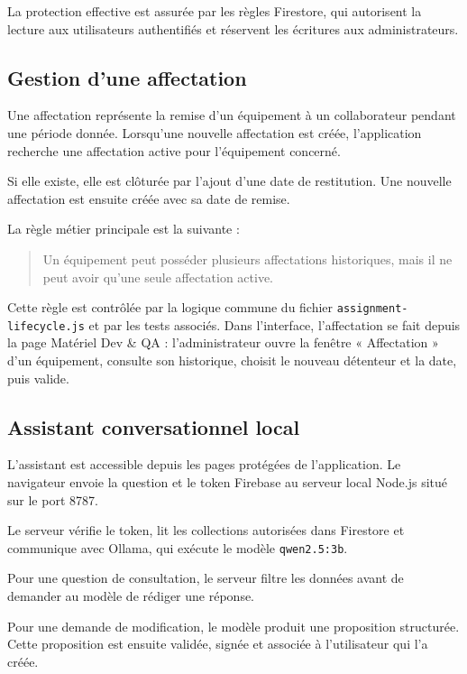 \documentclass{rapportENSIAS}
\begin{document}
La protection effective est assurée par les règles Firestore, qui autorisent la lecture aux utilisateurs authentifiés et réservent les écritures aux administrateurs.

\subsection{Gestion d’une affectation}

Une affectation représente la remise d’un équipement à un collaborateur pendant une période donnée. Lorsqu’une nouvelle affectation est créée, l’application recherche une affectation active pour l’équipement concerné.

Si elle existe, elle est clôturée par l’ajout d’une date de restitution. Une nouvelle affectation est ensuite créée avec sa date de remise.

La règle métier principale est la suivante :

\begin{quote}
Un équipement peut posséder plusieurs affectations historiques, mais il ne peut avoir qu’une seule affectation active.
\end{quote}

Cette règle est contrôlée par la logique commune du fichier \texttt{assignment-lifecycle.js} et par les tests associés. Dans l’interface, l’affectation se fait depuis la page Matériel Dev \& QA : l’administrateur ouvre la fenêtre « Affectation » d’un équipement, consulte son historique, choisit le nouveau détenteur et la date, puis valide.

\subsection{Assistant conversationnel local}

L’assistant est accessible depuis les pages protégées de l’application. Le navigateur envoie la question et le token Firebase au serveur local Node.js situé sur le port 8787.

Le serveur vérifie le token, lit les collections autorisées dans Firestore et communique avec Ollama, qui exécute le modèle \texttt{qwen2.5:3b}.

Pour une question de consultation, le serveur filtre les données avant de demander au modèle de rédiger une réponse.

Pour une demande de modification, le modèle produit une proposition structurée. Cette proposition est ensuite validée, signée et associée à l’utilisateur qui l’a créée.
\end{document}
